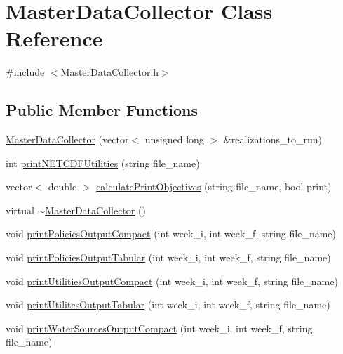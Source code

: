\hypertarget{classMasterDataCollector}{}\section{Master\+Data\+Collector Class Reference}
\label{classMasterDataCollector}


{\ttfamily \#include $<$Master\+Data\+Collector.\+h$>$}

\subsection*{Public Member Functions}
\begin{DoxyCompactItemize}
\item 
\mbox{\hyperlink{classMasterDataCollector_acb6f64c053bda26e5cf7e4ec8dacd0cd}{Master\+Data\+Collector}} (vector$<$ unsigned long $>$ \&realizations\+\_\+to\+\_\+run)
\item 
int \mbox{\hyperlink{classMasterDataCollector_afabd59af08d3ee5dec1a6710a1966e8e}{print\+N\+E\+T\+C\+D\+F\+Utilities}} (string file\+\_\+name)
\item 
vector$<$ double $>$ \mbox{\hyperlink{classMasterDataCollector_a30c5c81c8c2ccb475ce2ccbb2ae07608}{calculate\+Print\+Objectives}} (string file\+\_\+name, bool print)
\item 
virtual \mbox{\hyperlink{classMasterDataCollector_aaae6da0368b2050c4576c10298809c14}{$\sim$\+Master\+Data\+Collector}} ()
\item 
void \mbox{\hyperlink{classMasterDataCollector_aedd180f1f1648164506a0a59216c113f}{print\+Policies\+Output\+Compact}} (int week\+\_\+i, int week\+\_\+f, string file\+\_\+name)
\item 
void \mbox{\hyperlink{classMasterDataCollector_aa4a08525c6757376edba653a17d6ff60}{print\+Policies\+Output\+Tabular}} (int week\+\_\+i, int week\+\_\+f, string file\+\_\+name)
\item 
void \mbox{\hyperlink{classMasterDataCollector_a7effc4567580a12567a46dd3f195dbac}{print\+Utilities\+Output\+Compact}} (int week\+\_\+i, int week\+\_\+f, string file\+\_\+name)
\item 
void \mbox{\hyperlink{classMasterDataCollector_a772bc65951a1170900e89679cc7e0652}{print\+Utilites\+Output\+Tabular}} (int week\+\_\+i, int week\+\_\+f, string file\+\_\+name)
\item 
void \mbox{\hyperlink{classMasterDataCollector_adbe50e49689078e64a28450087ad0961}{print\+Water\+Sources\+Output\+Compact}} (int week\+\_\+i, int week\+\_\+f, string file\+\_\+name)

\end{DoxyCompactItemize}
